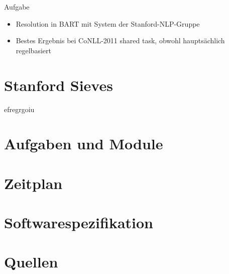 \documentclass[11pt,a4paper]{beamer}
\begin{document}
\begin{frame}{Aufgabe}
\begin{itemize}
\item Resolution in BART mit System der Stanford-NLP-Gruppe
\item Bestes Ergebnis bei CoNLL-2011 shared task, obwohl hauptsächlich regelbasiert
\end{itemize}
\end{frame}

\section{Stanford Sieves}
\begin{frame}
efregrgoiu
\end{frame}

\section{Aufgaben und Module}
\section{Zeitplan}
\section{Softwarespezifikation}
\section{Quellen}
\end{document}
